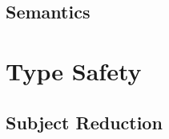 \documentclass{llncs}
\begin{document}
\subsection{Semantics}













\section{Type Safety}

\subsection{Subject Reduction}
\end{document}
